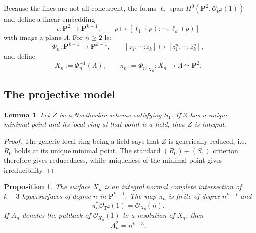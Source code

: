 \documentclass[11pt]{article}
\newtheorem{proposition}[theorem]{Proposition}
\newtheorem{lemma}[theorem]{Lemma}
\newcommand{\PP}{\mathbf P}
\newcommand{\OO}{\mathcal O}
\begin{document}
Because the lines are not all concurrent, the forms $\ell_i$ span
$H^0(\PP^2,\OO_{\PP^2}(1))$ and define a linear embedding
\[
 \iota:\PP^2\longrightarrow\PP^{k-1},
 \qquad
 p\longmapsto[\ell_1(p):\cdots:\ell_k(p)]
\]
with image a plane $\Lambda$.  For $n\ge2$ let
\[
 \Phi_n:\PP^{k-1}\longrightarrow\PP^{k-1},
 \qquad [z_1:\cdots:z_k]\longmapsto[z_1^n:\cdots:z_k^n],
\]
and define
\[
        X_n:=\Phi_n^{-1}(\Lambda),
        \qquad
        \pi_n:=\Phi_n|_{X_n}:X_n\to\Lambda\simeq\PP^2.
\]

\subsection{The projective model}

\begin{lemma}\label{lem:s1-generic-field}
Let $Z$ be a Noetherian scheme satisfying $S_1$.  If $Z$ has a unique minimal
point and its local ring at that point is a field, then $Z$ is integral.
\end{lemma}

\begin{proof}
The generic local ring being a field says that $Z$ is generically reduced, i.e.
$R_0$ holds at its unique minimal point.  The standard $(R_0)+(S_1)$ criterion
therefore gives reducedness, while uniqueness of the minimal point gives
irreducibility.
\end{proof}

\begin{proposition}\label{prop:model}
The surface $X_n$ is an integral normal complete intersection of $k-3$
hypersurfaces of degree $n$ in $\PP^{k-1}$.  The map $\pi_n$ is finite of
degree $n^{k-1}$ and
\[
        \pi_n^*\OO_{\PP^2}(1)=\OO_{X_n}(n).
\]
If $A_n$ denotes the pullback of $\OO_{X_n}(1)$ to a resolution of $X_n$, then
\begin{equation}\label{eq:A-square}
        A_n^2=n^{k-3}.
\end{equation}
\end{proposition}
\end{document}
